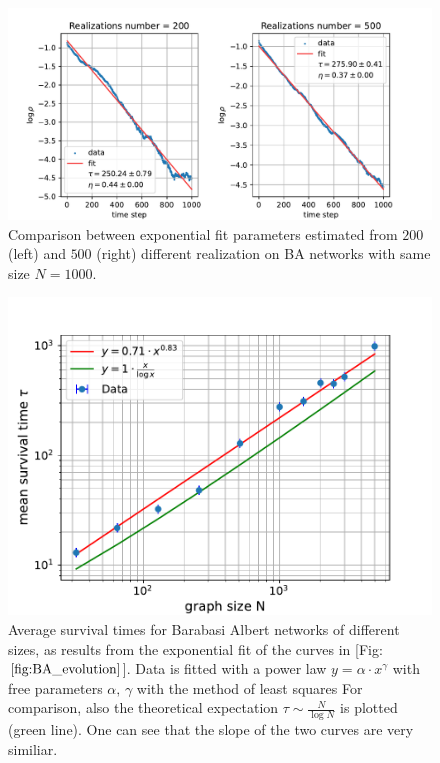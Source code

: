 \begin{figure}[H]
    \centering
    \includegraphics[width=\linewidth]{latex_source/images/voter/comparison.pdf}
    \caption{Comparison between exponential fit parameters estimated from $200$ (left) and $500$ (right) different realization on BA networks with same size $N=1000$. }
    \label{fig:enter-label}
\end{figure}

\begin{figure}[H]
    \centering
    \includegraphics[width=0.7\linewidth]{latex_source/images/voter/BA_time_scaling.pdf}
    \caption{Average survival times for Barabasi Albert networks of different sizes, as results from the exponential fit of the curves in [Fig: $\ref{fig:BA_evolution}$]. Data is fitted with a power law $y = \alpha \cdot x^\gamma$ with free parameters $\alpha,\, \gamma$ with the method of least squares For comparison, also the theoretical expectation $\tau \sim \frac{N}{\log{N}}$ is plotted (green line). One can see that the slope of the two curves are very similiar.}
    \label{fig:BA_scaling}
\end{figure}